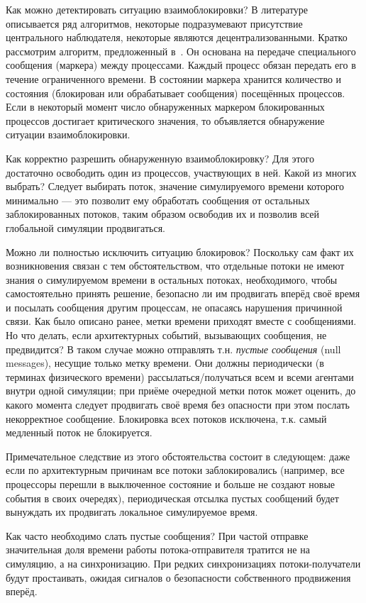 Как можно детектировать ситуацию взаимоблокировки? В литературе описывается ряд алгоритмов, некоторые подразумевают присутствие центрального наблюдателя, некоторые являются децентрализованными. Кратко рассмотрим алгоритм, предложенный в~\cite{Misra86distributeddiscrete-event}. Он основана на  передаче специального сообщения (маркера) между процессами. Каждый процесс обязан передать его в течение ограниченного времени. В состоянии маркера хранится количество и состояния (блокирован или обрабатывает сообщения) посещённых процессов. Если в некоторый момент число обнаруженных маркером блокированных процессов достигает критического значения, то объявляется обнаружение ситуации взаимоблокировки.

Как корректно разрешить обнаруженную взаимоблокировку? Для этого достаточно освободить один из процессов, участвующих в ней. Какой из многих выбрать? Следует выбирать поток, значение симулируемого времени которого минимально --- это позволит ему обработать сообщения от остальных заблокированных потоков, таким образом освободив их и позволив всей глобальной симуляции продвигаться. 

Можно ли полностью исключить ситуацию блокировок? Поскольку сам факт их возникновения связан с тем обстоятельством, что отдельные потоки не имеют знания о симулируемом времени в остальных потоках, необходимого, чтобы самостоятельно принять решение, безопасно ли им продвигать вперёд своё время и посылать сообщения другим процессам, не опасаясь нарушения причинной связи. Как было описано ранее, метки времени приходят вместе с сообщениями. Но что делать, если архитектурных событий, вызывающих сообщения, не предвидится? В таком случае можно отправлять т.н. \textit{пустые сообщения} (\abbr null messages), несущие только метку времени. Они должны периодически (в терминах физического времени) рассылаться/получаться всем и всеми агентами внутри одной симуляции; при приёме очередной метки поток может оценить, до какого момента следует продвигать своё время без опасности при этом послать некорректное сообщение. Блокировка всех потоков исключена, т.к. самый медленный поток не блокируется.

Примечательное следствие из этого обстоятельства состоит в следующем: даже если по архитектурным причинам все потоки заблокировались (например, все процессоры перешли в выключенное состояние и больше не создают новые события в своих очередях), периодическая отсылка пустых сообщений будет вынуждать их продвигать локальное симулируемое время.

Как часто необходимо слать пустые сообщения? При частой отправке значительная доля времени работы потока-отправителя тратится не на симуляцию, а на синхронизацию. При редких синхронизациях потоки-получатели будут простаивать, ожидая сигналов о безопасности собственного продвижения вперёд.


